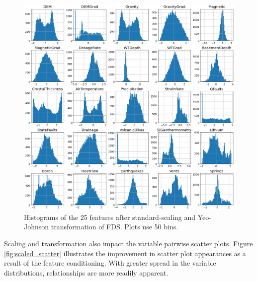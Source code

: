 \begin{figure}[!htp]
\centering
\includegraphics[width=\textwidth]{templates/images/Figure-Scaled_Histograms.png}
\caption[Conditioned FDS histograms]{Histograms of the 25 features after standard-scaling and Yeo-Johnson transformation of FDS. Plots use 50 bins.}
\label{fig:scaled_hist}
\end{figure}

Scaling and transformation also impact the variable pairwise scatter plots. Figure \ref{fig:scaled_scatter} illustrates the improvement in scatter plot appearances as a result of the feature conditioning. With greater spread in the variable distributions, relationships are more readily apparent.

